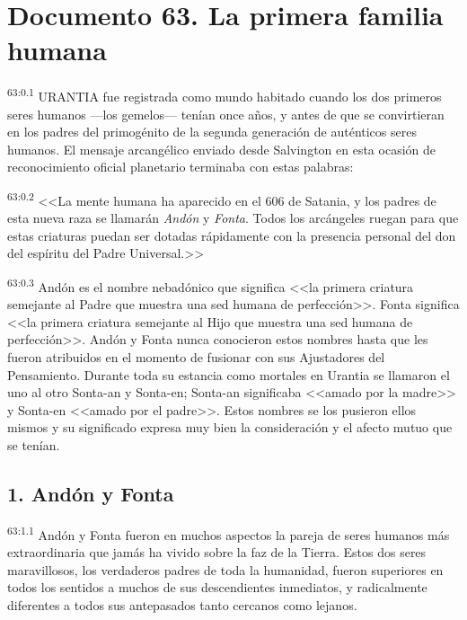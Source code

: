 \chapter{Documento 63. La primera familia humana}
\par
\textsuperscript{63:0.1} URANTIA fue registrada como mundo habitado cuando los dos primeros seres humanos ---los gemelos--- tenían once años, y antes de que se convirtieran en los padres del primogénito de la segunda generación de auténticos seres humanos. El mensaje arcangélico enviado desde Salvington en esta ocasión de reconocimiento oficial planetario terminaba con estas palabras:

\par
\textsuperscript{63:0.2} <<La mente humana ha aparecido en el 606 de Satania, y los padres de esta nueva raza se llamarán \textit{Andón} y \textit{Fonta}. Todos los arcángeles ruegan para que estas criaturas puedan ser dotadas rápidamente con la presencia personal del don del espíritu del Padre Universal.>>

\par
\textsuperscript{63:0.3} Andón es el nombre nebadónico que significa <<la primera criatura semejante al Padre que muestra una sed humana de perfección>>. Fonta significa <<la primera criatura semejante al Hijo que muestra una sed humana de perfección>>. Andón y Fonta nunca conocieron estos nombres hasta que les fueron atribuidos en el momento de fusionar con sus Ajustadores del Pensamiento. Durante toda su estancia como mortales en Urantia se llamaron el uno al otro Sonta-an y Sonta-en; Sonta-an significaba <<amado por la madre>> y Sonta-en <<amado por el padre>>. Estos nombres se los pusieron ellos mismos y su significado expresa muy bien la consideración y el afecto mutuo que se tenían.

\section*{1. Andón y Fonta}
\par
\textsuperscript{63:1.1} Andón y Fonta fueron en muchos aspectos la pareja de seres humanos más extraordinaria que jamás ha vivido sobre la faz de la Tierra. Estos dos seres maravillosos, los verdaderos padres de toda la humanidad, fueron superiores en todos los sentidos a muchos de sus descendientes inmediatos, y radicalmente diferentes a todos sus antepasados tanto cercanos como lejanos.

